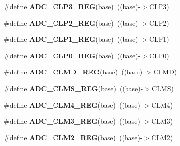 \begin{DoxyCompactItemize}
\#define {\bfseries A\+D\+C\+\_\+\+C\+L\+P3\+\_\+\+R\+EG}(base)~((base)-\/$>$C\+L\+P3)
\item 
\mbox{\label{group___a_d_c___register___accessor___macros_ga59b503ad646bea3c6f9496a0845c5618}} 
\#define {\bfseries A\+D\+C\+\_\+\+C\+L\+P2\+\_\+\+R\+EG}(base)~((base)-\/$>$C\+L\+P2)
\item 
\mbox{\label{group___a_d_c___register___accessor___macros_ga2cb9a9c57990869bcdd2a906bb500ab5}} 
\#define {\bfseries A\+D\+C\+\_\+\+C\+L\+P1\+\_\+\+R\+EG}(base)~((base)-\/$>$C\+L\+P1)
\item 
\mbox{\label{group___a_d_c___register___accessor___macros_ga34e45f740cbe3d74b8024f94e3b1288c}} 
\#define {\bfseries A\+D\+C\+\_\+\+C\+L\+P0\+\_\+\+R\+EG}(base)~((base)-\/$>$C\+L\+P0)
\item 
\mbox{\label{group___a_d_c___register___accessor___macros_ga412c1dd72113c5718cf0868df32b93d4}} 
\#define {\bfseries A\+D\+C\+\_\+\+C\+L\+M\+D\+\_\+\+R\+EG}(base)~((base)-\/$>$C\+L\+MD)
\item 
\mbox{\label{group___a_d_c___register___accessor___macros_gac5b2214b1d9c827e78e531fa50f01116}} 
\#define {\bfseries A\+D\+C\+\_\+\+C\+L\+M\+S\+\_\+\+R\+EG}(base)~((base)-\/$>$C\+L\+MS)
\item 
\mbox{\label{group___a_d_c___register___accessor___macros_ga2450c7724303c1db5fac00c810437e4c}} 
\#define {\bfseries A\+D\+C\+\_\+\+C\+L\+M4\+\_\+\+R\+EG}(base)~((base)-\/$>$C\+L\+M4)
\item 
\mbox{\label{group___a_d_c___register___accessor___macros_ga0a8093e23425c874338420fc5d597bb2}} 
\#define {\bfseries A\+D\+C\+\_\+\+C\+L\+M3\+\_\+\+R\+EG}(base)~((base)-\/$>$C\+L\+M3)
\item 
\mbox{\label{group___a_d_c___register___accessor___macros_gadf744875fb3c71dbc6d0a7cde6a8b0b4}} 
\#define {\bfseries A\+D\+C\+\_\+\+C\+L\+M2\+\_\+\+R\+EG}(base)~((base)-\/$>$C\+L\+M2)

\end{DoxyCompactItemize}
